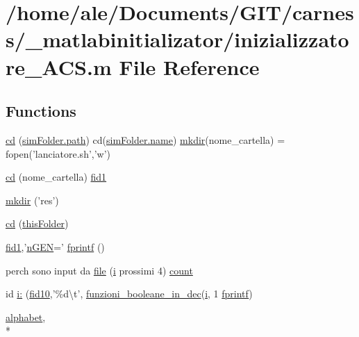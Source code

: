 \hypertarget{a00062}{\section{/home/ale/\-Documents/\-G\-I\-T/carness/\-\_\-matlabinitializator/inizializzatore\-\_\-\-A\-C\-S.m File Reference}
\label{a00062}
}
\subsection*{Functions}
\begin{DoxyCompactItemize}
\item 
\hyperlink{a00062_ab526c3939d1049806db989cf3095fc9a}{cd} (\hyperlink{a00065_af28466084b87af2cdc5c7b48f4661f2d}{sim\-Folder.\-path}) cd(\hyperlink{a00021_abbf559a76fab59203496b0847ab9502a}{sim\-Folder.\-name}) \hyperlink{a00062_ae58a11ed5ac7873b1039a391d5c86a05}{mkdir}(nome\-\_\-cartella) = fopen('lanciatore.\-sh','w')
\item 
\hyperlink{a00062_a778632868660bf2a5fb3a44735cfc066}{cd} (nome\-\_\-cartella) \hyperlink{a00022_ae941ef58ebac7f05a8095badde51c07b}{fid1}
\item 
\hyperlink{a00062_ae58a11ed5ac7873b1039a391d5c86a05}{mkdir} ('res')
\item 
\hyperlink{a00062_a767271ad82d244871370a0f0e6a7f8a4}{cd} (\hyperlink{a00065_a2d4125646b62462ce279d82913125ccf}{this\-Folder})
\item 
\hyperlink{a00022_ae941ef58ebac7f05a8095badde51c07b}{fid1},'\hyperlink{a00065_a4c8fe523edbe179c5d215da13f469f72}{n\-G\-E\-N}=' \hyperlink{a00062_aa6dc40efe43a338c9ff278260d95b4d9}{fprintf} ()
\item 
perch sono input da \hyperlink{a00062_a4e8353d6c62cf54bf4a1a8f63e56b8c3}{file} (\hyperlink{a00065_ad3efca1ea6e3333daf30719ee0501862}{i} prossimi 4) \hyperlink{a00062_aa0a4866d2600caeb20cfacee8eefc922}{count}
\item 
id \hyperlink{a00062_ab5fb59cb99841dd445fbd224275fa226}{i\-:} (\hyperlink{a00062_aadad4fd2d661ea2b9f0c3a95e3f7b4ba}{fid10},'\%d\textbackslash{}t', \hyperlink{a00065_aca80ac3e93dabd95e623a51f90fb37b6}{funzioni\-\_\-booleane\-\_\-in\-\_\-dec}(\hyperlink{a00065_ad3efca1ea6e3333daf30719ee0501862}{i}, 1 \hyperlink{a00062_aa6dc40efe43a338c9ff278260d95b4d9}{fprintf})
\item 
\hyperlink{a00065_abcbc32fc68e4323620d6171a17310212}{alphabet}, \\*

\end{DoxyCompactItemize}
